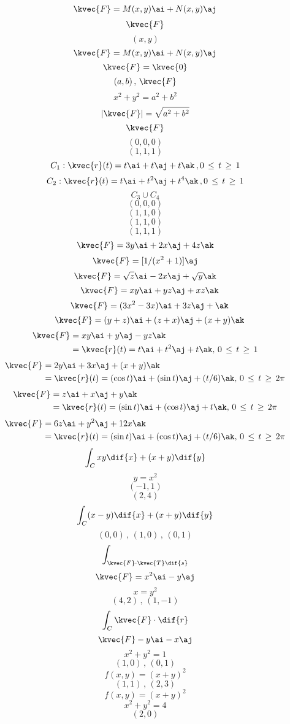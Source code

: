 \begin{align*}
\kvec{F}=M(x,y)\ai + N(x,y)\aj	
\end{align*}
\[\kvec{F}\]
\[(x,y)\]
\[\kvec{F}=M(x,y)\ai + N(x,y)\aj	\]
\[\kvec{F}=\kvec{0}	\]
\[(a,b)\, ,\, \kvec{F}	\]
\[x^{2}+y^{2}=a^{2}+b^{2}\]
\[|\kvec{F} | = \sqrt{a^{2}+b^{2}}\]
\[\kvec{F}\]
\[(0,0,0)\]
\[(1,1,1)\]
\[C_{1} : \kvec{r}(t)=t\ai +t\aj +t\ak \, , 0\, \le \, t \, \ge \, 1\]
\[C_{2} : \kvec{r}(t)=t\ai + t^{2}\aj + t^{4} \ak \, , 0\, \le \, t \, \ge \, 1	\]
\[C_{3} \cup C_{4}\]
\[(0,0,0)\]
\[(1,1,0)\]
\[(1,1,0)\]
\[(1,1,1)\]
\[\kvec{F} = 3y\ai + 2x \aj + 4z\ak\]
\[\kvec{F}= [1/(x^{2}+1)]\aj\]
\[\kvec{F}=\sqrt{z}\ai -2x\aj +\sqrt{y}\ak\]
\[\quad \kvec{F}=xy\ai +yz\aj + xz\ak\]
\[\quad \kvec{F}=(3x^{2} -3x)\ai + 3z\aj + \ak\]
\[\quad 	\kvec{F}=(y+z)\ai + (z+x)\aj+(x+y)\ak\]
\begin{align*}
\kvec{F}&=xy\ai +y\aj -yz\ak \\
&=\kvec{r}(t)=t\ai +t^{2}\aj +t\ak,\, 0\, \le \,t\, \ge \, 1
\end{align*}
\begin{align*}
\kvec{F}&= 2y\ai +3x\aj +(x+y)\ak \\
&=\kvec{r}(t)= (\cos t)\ai + (\sin t)\aj +(t/6)\ak ,\, 0\, \le \,t\, \ge \, 2\pi
\end{align*}
\begin{align*}
\kvec{F}&= z\ai + x\aj +y\ak \\
&=\kvec{r}(t)= (\sin t)\ai + (\cos t)\aj +t\ak ,\, 0\, \le \,t\, \ge \, 2\pi
\end{align*}
\begin{align*}
\kvec{F}&= 6z\ai + y^{2}\aj +12x\ak \\
&=\kvec{r}(t)= (\sin t)\ai + (\cos t)\aj +(t/6)\ak ,\, 0\, \le \,t\, \ge \, 2\pi\\
\end{align*}
\[\int_{C} xy \dif{x} + (x+y)\dif{y}\]
\[y=x^{2}\]
\[(-1,1)\]
\[(2,4)\]
\[\int_{C} (x-y)\dif{x} +(x+y)\dif{y}\]
\[(0,0)\, , \,(1,0)\, , \, (0,1)\]
\[\int_{\kvec{F} \cdot \kvec{T} \dif{s}}\]
\[\kvec{F}=x^{2}\ai -y\aj\]
\[x=y^{2}\]
\[(4,2)\, , \, (1,-1)\]
\[\int_{C} \kvec{F} \cdot \dif{r}\]
\[\kvec{F} - y\ai - x\aj\]
\[x^{2} + y^{2}=1\]
\[(1,0)\, , \, (0,1)\]
\[f(x,y)=(x+y)^{2}\]
\[(1,1)\, , \, (2,3)\]
\[f(x,y)= (x+y)^{2}\]
\[x^{2}+y^{2}=4\]
\[(2,0)\]
